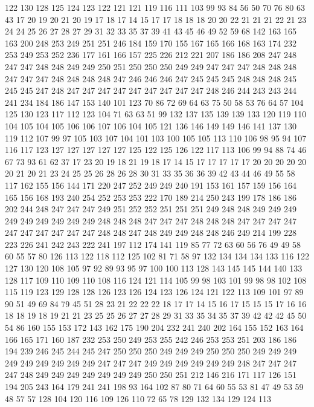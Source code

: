 122 130 128 125 124 123 122 121 121 119 116 111 103 99 93 84 56 50 70 76
80 63 43 17 20 19 20 21 20 19 17 18 17 14 15 17 17 18 18 18
20 20 22 21 21 21 22 21 23 24 24 25 26 27 28 27 29 31 32 33
35 37 39 41 43 45 46 49 52 59 68 142 163 165 163 200 248 253 249 251
251 246 184 159 170 155 167 165 166 168 163 174 232 253 249 253 252 236 177 161
166 157 225 226 212 221 207 186 186 208 247 248 247 247 248 248 249 249 250 251
250 250 250 249 249 247 247 247 248 248 248 247 247 247 248 248 248 248 247 246
246 246 247 245 245 245 248 248 248 245 245 245 247 248 247 247 247 247 247 247
247 247 247 248 246 244 243 243 244 241 234 184 186 147 153 140 101 123 70 86
72 69 64 63 75 50 58 53 76 64 57 104 125 130 123 117 112 123 104 71
63 63 51 99 132 137 135 139 139 133 120 119 110 104 105 104 105 106 106 107
106 104 105 121 136 146 149 149 146 141 137 130 119 112 107 99 97 105 103 107
104 101 103 100 105 105 113 110 106 98 95 94 107 116 117 123 127 127 127 127
127 125 122 125 126 122 117 113 106 99 94 88 74 46 67 73 93 61 62 37
17 23 20 19 18 21 19 18 17 14 15 17 17 17 17 17 20 20 20 20
20 20 21 20 21 23 24 25 25 26 28 26 28 30 31 33 35 36 36 39
42 43 44 46 49 55 58 117 162 155 156 144 171 220 247 252 249 249 240 191
153 161 157 159 156 164 165 156 168 193 240 254 252 253 253 222 170 189 214 250
243 199 178 186 186 202 244 248 247 247 247 249 251 252 252 251 251 251 249 248
248 249 249 249 249 249 249 249 249 249 248 248 248 247 247 247 248 248 248 247
247 247 247 247 247 247 247 247 247 248 248 247 248 249 249 248 248 246 249 214
199 228 223 226 241 242 243 222 241 197 112 174 141 119 85 77 72 63 60 56
76 49 49 58 60 55 57 80 126 113 122 118 112 125 102 81 71 58 97 132
134 134 134 133 116 122 127 130 120 108 105 97 92 89 93 95 97 100 100 113
128 143 145 145 144 140 133 128 117 109 110 109 110 108 116 124 121 114 105 99
98 103 101 99 98 98 102 108 115 119 123 129 128 128 126 123 126 124 123 126
124 121 122 113 109 101 97 89 90 51 49 69 84 79 45 51 28 23 21 22
22 22 18 17 17 14 15 16 17 15 15 15 17 16 16 18 18 19 18 19
21 21 23 25 25 26 27 27 28 29 31 33 35 34 35 37 39 42 42 42
45 50 54 86 160 155 153 172 143 162 175 190 204 232 241 240 202 164 155 152
163 164 166 165 171 160 187 232 253 250 249 253 255 242 246 253 253 251 203 186
186 194 239 246 245 244 245 247 250 250 250 249 249 249 250 250 250 249 249 249
249 249 249 249 249 249 247 247 247 249 249 249 249 249 249 248 247 247 247 247
248 249 249 249 249 249 249 249 250 250 251 212 146 216 171 117 126 151 194 205
243 164 179 241 241 198 93 164 102 87 80 71 64 60 55 53 81 47 49 53
59 48 57 57 128 104 120 116 109 126 110 72 65 78 129 132 134 129 124 113
